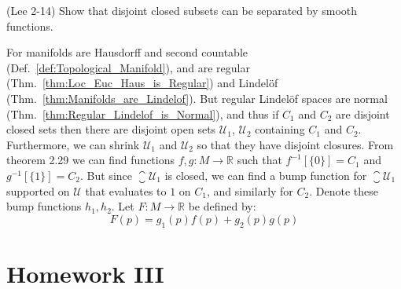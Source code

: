 \documentclass{article}                                                        %
\begin{document}
        \begin{problem}
            (Lee 2-14) Show that disjoint closed subsets can be separated by
            smooth functions.
        \end{problem}
        \begin{solution}
            For manifolds are Hausdorff and second countable
            (Def.~\ref{def:Topological_Manifold}), and are regular
            (Thm.~\ref{thm:Loc_Euc_Haus_is_Regular}) and Lindel\"{o}f
            (Thm.~\ref{thm:Manifolds_are_Lindelof}). But regular Lindel\"{o}f
            spaces are normal (Thm.~\ref{thm:Regular_Lindelof_is_Normal}), and
            thus if $C_{1}$ and $C_{2}$ are disjoint closed sets then there are
            disjoint open sets $\mathcal{U}_{1}$, $\mathcal{U}_{2}$ containing
            $C_{1}$ and $C_{2}$. Furthermore, we can shrink $\mathcal{U}_{1}$
            and $\mathcal{U}_{2}$ so that they have disjoint closures. From
            theorem 2.29 we can find functions $f,g:M\rightarrow\mathbb{R}$ such
            that $f^{\minus{1}}[\{0\}]=C_{1}$ and $g^{\minus{1}}[\{1\}]=C_{2}$.
            But since $\closure{\mathcal{U}_{1}}$ is closed, we can find a bump
            function for $\closure{\mathcal{U}_{1}}$ supported on $\mathcal{U}$
            that evaluates to $1$ on $C_{1}$, and similarly for $C_{2}$.
            Denote these bump functions $h_{1},h_{2}$. Let
            $F:M\rightarrow\mathbb{R}$ be defined by:
            \begin{equation}
                F(p)=g_{1}(p)f(p)+g_{2}(p)g(p)
            \end{equation}
        \end{solution}
    \section{Homework III}
\end{document}
